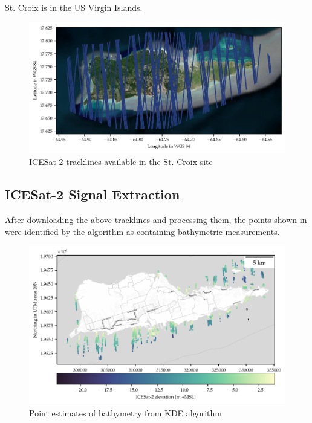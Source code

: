 St. Croix is in the US Virgin Islands. 

\begin{figure}[h]
    \centering
    \includegraphics[width=\textwidth]{figures/Stcroix_tracklines.pdf}
    \caption{ICESat-2 tracklines available in the St. Croix site}
    \label{fig:st-croix-tracklines}
\end{figure}

\subsection{ICESat-2 Signal Extraction}
After downloading the above tracklines and processing them, the points shown in were identified by the algorithm as containing bathymetric measurements.

\begin{figure}[h]
    \centering
    \includegraphics[width=\textwidth]{figures/Stcroix_photon_map.pdf}
    \caption{Point estimates of bathymetry from KDE algorithm }
    \label{fig:stcroix-bathy-points}
\end{figure}

